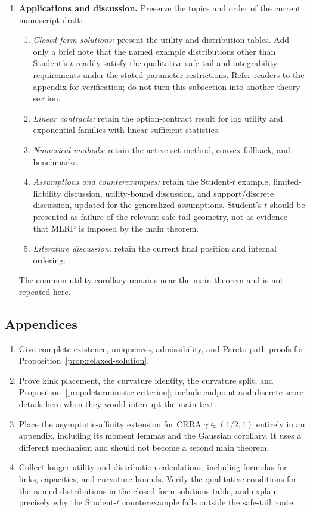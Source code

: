 \documentclass[11pt]{article}
\theoremstyle{remark}
\begin{document}
\begin{enumerate}
 \item \textbf{Applications and discussion.}  Preserve the topics and order of
 the current manuscript draft:
 \begin{enumerate}[label=(\alph*)]
  \item \emph{Closed-form solutions:} present the utility and distribution
  tables.  Add only a brief note that the named example distributions other
  than Student's $t$ readily satisfy the qualitative safe-tail and integrability
  requirements under the stated parameter restrictions.  Refer readers to the
  appendix for verification; do not turn this subsection into another theory
  section.
  \item \emph{Linear contracts:} retain the option-contract result for log
  utility and exponential families with linear sufficient statistics.
  \item \emph{Numerical methods:} retain the active-set method, convex fallback,
  and benchmarks.
  \item \emph{Assumptions and counterexamples:} retain the Student-$t$ example,
  limited-liability discussion, utility-bound discussion, and support/discrete
  discussion, updated for the generalized assumptions.  Student's $t$ should be
  presented as failure of the relevant safe-tail geometry, not as evidence that
  MLRP is imposed by the main theorem.
  \item \emph{Literature discussion:} retain the current final position and
  internal ordering.
 \end{enumerate}
 The common-utility corollary remains near the main theorem and is not repeated
 here.
\end{enumerate}

\subsection*{Appendices}

\begin{enumerate}
 \item Give complete existence, uniqueness, admissibility, and Pareto-path proofs
 for Proposition~\ref{prop:relaxed-solution}.
 \item Prove kink placement, the curvature identity, the curvature split, and
 Proposition~\ref{prop:deterministic-criterion}; include endpoint and discrete-score
 details here when they would interrupt the main text.
 \item Place the asymptotic-affinity extension for CRRA
 $\gamma\in(1/2,1)$ entirely in an appendix, including its moment lemmas and the
 Gaussian corollary.  It uses a different mechanism and should not become a
 second main theorem.
 \item Collect longer utility and distribution calculations, including formulas
 for links, capacities, and curvature bounds.  Verify the qualitative conditions
 for the named distributions in the closed-form-solutions table, and explain
 precisely why the Student-$t$ counterexample falls outside the safe-tail route.
\end{enumerate}
\end{document}
